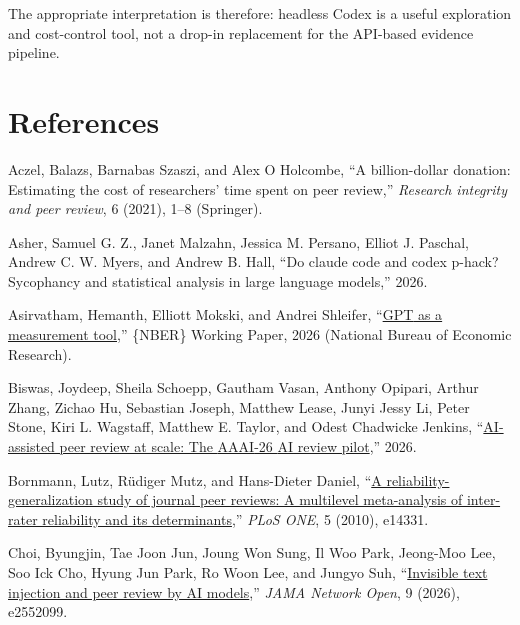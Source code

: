\documentclass[
  11pt,
  letterpaper,
]{article}
\newlength{\cslhangindent}
\newenvironment{CSLReferences}[2] %
 {\begin{list}{}{%
  \setlength{\itemindent}{0pt}
  \setlength{\leftmargin}{0pt}
  \setlength{\parsep}{0pt}
  \ifodd #1
   \setlength{\leftmargin}{\cslhangindent}
   \setlength{\itemindent}{-1\cslhangindent}
  \fi
  \setlength{\itemsep}{#2\baselineskip}}}
 {\end{list}}
\begin{document}
The appropriate interpretation is therefore: headless Codex is a useful
exploration and cost-control tool, not a drop-in replacement for the
API-based evidence pipeline.


\section*{References}\label{references}


\label{refs}
\begin{CSLReferences}{1}{0}
Aczel, Balazs, Barnabas Szaszi, and Alex O Holcombe, {``A billion-dollar
donation: Estimating the cost of researchers' time spent on peer
review,''} \emph{Research integrity and peer review}, 6 (2021), 1--8
(Springer).

Asher, Samuel G. Z., Janet Malzahn, Jessica M. Persano, Elliot J.
Paschal, Andrew C. W. Myers, and Andrew B. Hall, {``Do claude code and
codex p-hack? {Sycophancy} and statistical analysis in large language
models,''} 2026.

Asirvatham, Hemanth, Elliott Mokski, and Andrei Shleifer,
{``\href{https://www.nber.org/papers/w34834}{{GPT} as a measurement
tool},''} \{NBER\} Working Paper, 2026 (National Bureau of Economic
Research).

Biswas, Joydeep, Sheila Schoepp, Gautham Vasan, Anthony Opipari, Arthur
Zhang, Zichao Hu, Sebastian Joseph, Matthew Lease, Junyi Jessy Li, Peter
Stone, Kiri L. Wagstaff, Matthew E. Taylor, and Odest Chadwicke Jenkins,
{``\href{https://doi.org/10.48550/arXiv.2604.13940}{{AI}-assisted peer
review at scale: The {AAAI}-26 {AI} review pilot},''} 2026.

Bornmann, Lutz, Rüdiger Mutz, and Hans-Dieter Daniel,
{``\href{https://doi.org/10.1371/journal.pone.0014331}{A
reliability-generalization study of journal peer reviews: A multilevel
meta-analysis of inter-rater reliability and its determinants},''}
\emph{PLoS ONE}, 5 (2010), e14331.

Choi, Byungjin, Tae Joon Jun, Joung Won Sung, Il Woo Park, Jeong-Moo
Lee, Soo Ick Cho, Hyung Jun Park, Ro Woon Lee, and Jungyo Suh,
{``\href{https://doi.org/10.1001/jamanetworkopen.2025.52099}{Invisible
text injection and peer review by AI models},''} \emph{JAMA Network
Open}, 9 (2026), e2552099.


\end{CSLReferences}
\end{document}
